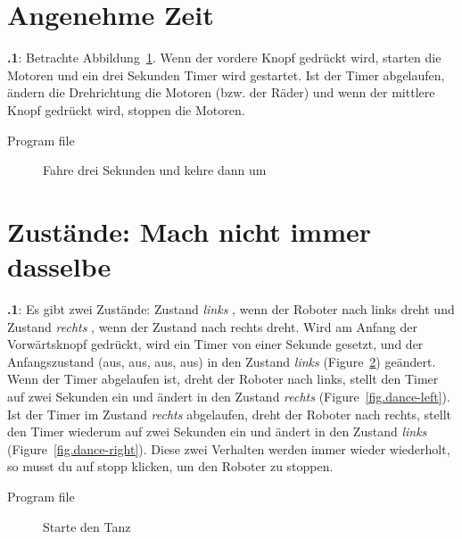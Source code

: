 \documentclass[12pt,a4paper,english]{article}
\begin{document}
\section{Angenehme Zeit}

\textbf{\thesection.1}:
Betrachte Abbildung~\ref{fig.three}. Wenn der vordere Knopf gedrückt wird, starten die Motoren und ein drei Sekunden Timer wird gestartet. Ist der Timer abgelaufen, ändern die Drehrichtung die Motoren (bzw. der Räder) und wenn der mittlere Knopf gedrückt wird, stoppen die Motoren.

{\raggedleft \hfill Program file }


\begin{figure}[hbt]
\begin{center}
\caption{Fahre drei Sekunden und kehre dann um}\label{fig.three}
\end{center}
\end{figure}


\section{Zustände: Mach nicht immer dasselbe}

\textbf{\thesection.1}:
Es gibt zwei Zustände: Zustand \emph{links} , wenn der Roboter nach links dreht und Zustand \emph{rechts}  , wenn der Zustand nach rechts dreht.
Wird am Anfang der Vorwärtsknopf gedrückt, wird ein Timer von einer Sekunde gesetzt, und der Anfangszustand (aus, aus, aus, aus) in den Zustand \emph{links} (Figure~\ref{fig.dance-start}) geändert. Wenn der Timer abgelaufen ist, dreht der Roboter nach links, stellt den Timer auf zwei Sekunden ein und ändert in den Zustand \emph{rechts} (Figure~\ref{fig.dance-left}). 
Ist der Timer im Zustand \emph{rechts} abgelaufen, dreht der Roboter nach rechts, stellt den Timer wiederum auf zwei Sekunden ein und ändert in den Zustand \emph{links} (Figure~\ref{fig.dance-right}). Diese zwei Verhalten werden immer wieder wiederholt, so musst du auf stopp  klicken, um den Roboter zu stoppen.


{\raggedleft \hfill Program file }


\begin{figure}
\begin{center}
\caption{Starte den Tanz}\label{fig.dance-start}
\end{center}
\end{figure}
\end{document}
